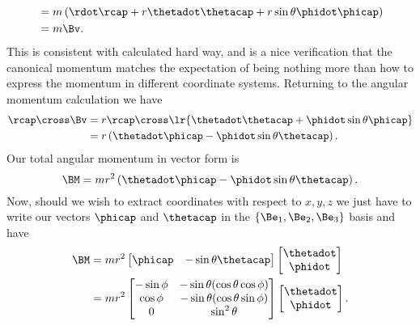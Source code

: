 {\begin{equation}
\begin{aligned}
&=
m
\left(
\rdot \rcap + r \thetadot \thetacap + r \sin\theta \phidot \phicap
\right) \\
&= m \Bv.
\end{aligned}
\end{equation}
%
This is consistent with  calculated hard way, and is a nice verification that the canonical momentum matches the expectation of being nothing more than how to express the momentum in different coordinate systems.  Returning to the angular momentum calculation we have
%
\begin{equation}\label{eqn:classicalMechanicsPs2:1070}
\begin{aligned}
\rcap \cross \Bv
&=
r \rcap \cross \lr{ \thetadot \thetacap + \phidot \sin\theta \phicap } \\
&=
r \left( \thetadot \phicap - \phidot \sin\theta \thetacap \right).
\end{aligned}
\end{equation}
%
Our total angular momentum in vector form is
%
\begin{equation}\label{eqn:classicalMechanicsPs2:310}
\BM = m r^2
\left( \thetadot \phicap - \phidot \sin\theta \thetacap \right).
\end{equation}
%
Now, should we wish to extract coordinates with respect to \(x,y,z\) we just have to write our vectors \(\phicap\) and \(\thetacap\) in the \(\{\Be_1, \Be_2, \Be_3\}\) basis and have
%
\begin{equation}\label{eqn:classicalMechanicsPs2:1090}
\begin{aligned}
\BM
&=
m r^2
\begin{bmatrix}
\phicap & -\sin\theta \thetacap
\end{bmatrix}
\begin{bmatrix}
\thetadot \\
\phidot
\end{bmatrix} \\
&=
m r^2
\begin{bmatrix}
-\sin\phi & -\sin\theta(\cos\theta \cos\phi) \\
\cos\phi & -\sin\theta(\cos\theta \sin\phi) \\
0 & \sin^2\theta
\end{bmatrix}
\begin{bmatrix}
\thetadot \\
\phidot
\end{bmatrix} .
\end{aligned}
\end{equation}
%
}
